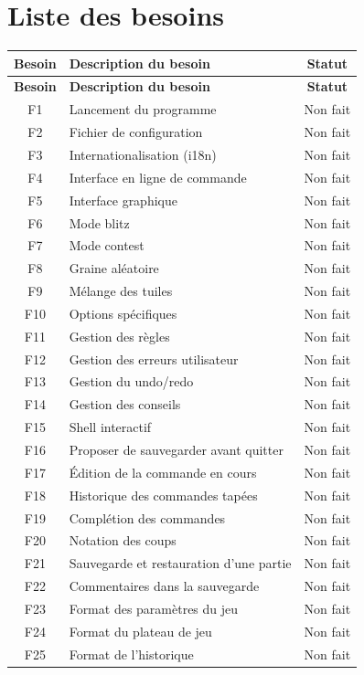 \documentclass[11pt]{article}
\begin{document}
\section{Liste des besoins}

\begin{longtable}{|c|l|c|}
\hline
\textbf{Besoin} & \textbf{Description du besoin} & \textbf{Statut} \\
\hline
\endfirsthead

\hline
\textbf{Besoin} & \textbf{Description du besoin} & \textbf{Statut} \\
\hline
\endhead

F1 & Lancement du programme & Non fait \\ \hline
F2 & Fichier de configuration & Non fait \\ \hline
F3 & Internationalisation (i18n) & Non fait \\ \hline
F4 & Interface en ligne de commande & Non fait \\ \hline
F5 & Interface graphique & Non fait \\ \hline
F6 & Mode blitz & Non fait \\ \hline
F7 & Mode contest & Non fait \\ \hline
F8 & Graine aléatoire & Non fait \\ \hline
F9 & Mélange des tuiles & Non fait \\ \hline
F10 & Options spécifiques & Non fait \\ \hline

F11 & Gestion des règles & Non fait \\ \hline
F12 & Gestion des erreurs utilisateur & Non fait \\ \hline
F13 & Gestion du undo/redo & Non fait \\ \hline
F14 & Gestion des conseils & Non fait \\ \hline

F15 & Shell interactif & Non fait \\ \hline
F16 & Proposer de sauvegarder avant quitter & Non fait \\ \hline
F17 & Édition de la commande en cours & Non fait \\ \hline
F18 & Historique des commandes tapées & Non fait \\ \hline
F19 & Complétion des commandes & Non fait \\ \hline
F20 & Notation des coups & Non fait \\ \hline

F21 & Sauvegarde et restauration d’une partie & Non fait \\ \hline
F22 & Commentaires dans la sauvegarde & Non fait \\ \hline
F23 & Format des paramètres du jeu & Non fait \\ \hline
F24 & Format du plateau de jeu & Non fait \\ \hline
F25 & Format de l’historique & Non fait \\ \hline


\end{longtable}
\end{document}
